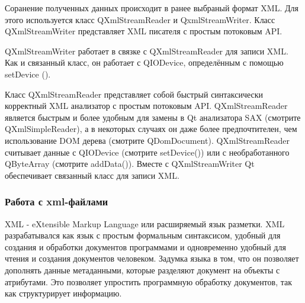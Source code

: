 Соранение полученных данных происходит в ранее выбраный формат XML. Для этого используется класс QXmlStreamReader и QxmlStreamWriter.
Класс QXmlStreamWriter представляет XML писателя с простым потоковым API.

QXmlStreamWriter работает в связке с QXmlStreamReader для записи XML. Как и связанный класс, он работает с QIODevice, определённым с помощью setDevice ().

Класс QXmlStreamReader представляет собой быстрый синтаксически корректный XML анализатор с простым потоковым API.
QXmlStreamReader является быстрым и более удобным для замены в Qt анализатора SAX (смотрите QXmlSimpleReader), а в некоторых случаях он даже более предпочтителен, чем использование DOM дерева (смотрите QDomDocument). QXmlStreamReader считывает данные с QIODevice (смотрите setDevice()) или с необработанного QByteArray (смотрите addData()). Вместе с QXmlStreamWriter Qt обеспечивает связанный класс для записи XML.

\subsubsection{Работа с xml-файлами}

XML - eXtensible Markup Language или расширяемый язык разметки. XML разрабатывался как язык с простым формальным синтаксисом, удобный для создания и обработки документов программами и одновременно удобный для чтения и создания документов человеком. Задумка языка в том, что он позволяет дополнять данные метаданными, которые разделяют документ на объекты с атрибутами. Это позволяет упростить программную обработку документов, так как структурирует информацию. 
